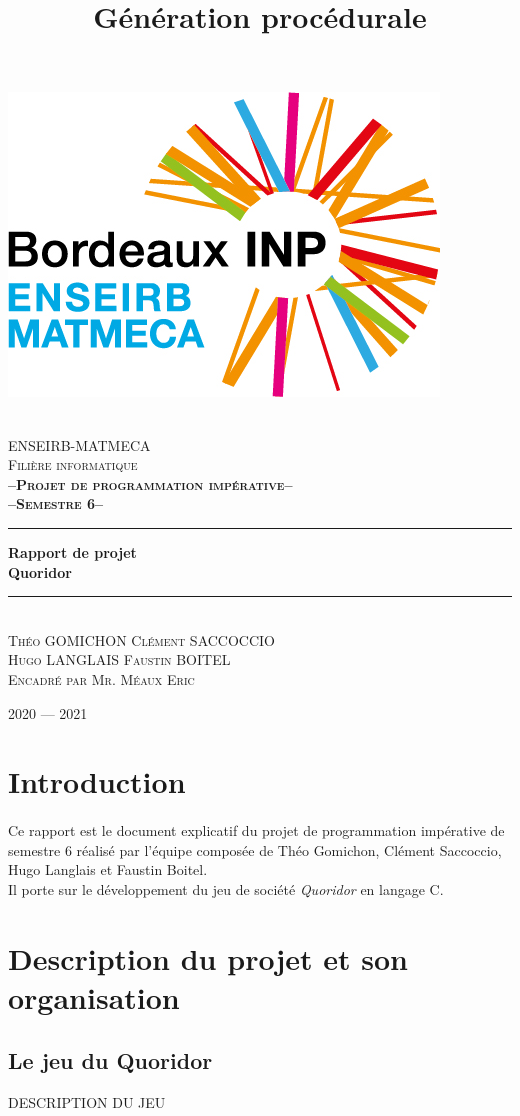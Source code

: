 \documentclass{article}
\title{Génération procédurale}
\author{}
\date{}
\newcommand{\HRule}{\rule{\linewidth}{0.5mm}}
\begin{document}
\begin{titlepage}
    \begin{center}
	    \includegraphics[scale=0.5]{logo.jpg}

        \textsc{\LARGE\\[0.5cm]ENSEIRB-MATMECA}
        \\[0.5cm]
        \textsc{\LARGE Filière informatique}
        \\[2cm]

        \textbf{\LARGE \textsc{--Projet de programmation impérative--}}
        \\
        \textbf{\LARGE \textsc{--Semestre 6--}}
        
        \HRule
        { \huge \textbf{Rapport de projet\\Quoridor}}
        \\[0.25cm]
        \HRule
        \\[1.5cm]
    
    	\textsc{\Large Théo GOMICHON\qquad}
    	\textsc{\Large Clément SACCOCCIO}\\[0.5cm]
    	\textsc{\Large Hugo LANGLAIS\qquad}
    	\textsc{\Large Faustin BOITEL}\\[0.5cm]
    	\textsc{\large Encadré par Mr. Méaux Eric}
        \vfill
       
        {\large \textsc{2020 — 2021}}
    \end{center}
\end{titlepage}

\section*{Introduction}
\paragraph{}
Ce rapport est le document explicatif du projet de programmation impérative de semestre 6 réalisé par l'équipe composée de Théo Gomichon, Clément Saccoccio, Hugo Langlais et Faustin Boitel. \\
Il porte sur le développement du jeu de société \textsl{Quoridor} en langage \textsf{C}.

\newpage
\tableofcontents
\fancyhead[L]{\slshape \leftmark}
\newpage

\section{Description du projet et son organisation}
\subsection{Le jeu du Quoridor}

DESCRIPTION DU JEU
\end{document}

